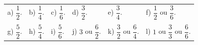 \documentclass[10 pt,usenames,dvipsnames, oneside]{article}
\begin{document}
\begin{enumerate} [label=\alph*)]
\end{enumerate} %

\ifdefined\prof

\begin{solucao}

\noindent\begin{tabular}{m{}m{}m{}m{}m{}m{}}
  a) $\dfrac{1}{2}$. &  b) $\dfrac{1}{4}$. & c) $\dfrac{1}{6}$. & d) $\dfrac{3}{2}$. &  e) $\dfrac{3}{4}$. &  f) $\dfrac{1}{2}$ ou $\dfrac{3}{6}$.   \\
\\
g) $\dfrac{5}{2}$. &  h) $\dfrac{5}{4}$. & i) $\dfrac{5}{6}$. & j) $3$ ou $\dfrac{6}{2}$.
    &  k) $\dfrac{3}{2}$ ou $\dfrac{6}{4}$. &  l) $1$ ou $\dfrac{3}{3}$ ou $\dfrac{6}{6}$.
\end{tabular} %

\end{solucao}
\fi
\end{document}
